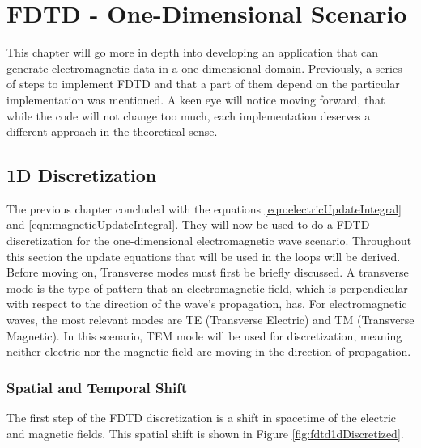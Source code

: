 
\chapter{FDTD - One-Dimensional Scenario} %

\label{Chapter2} %

This chapter will go more in depth into developing an application that can generate electromagnetic data in a one-dimensional domain. Previously, a series of steps to implement FDTD and that a part of them depend on the particular implementation was mentioned. A keen eye will notice moving forward, that while the code will not change too much, each implementation deserves a different approach in the theoretical sense.


\section{1D Discretization}

The previous chapter concluded with the equations \ref{eqn:electricUpdateIntegral} and \ref{eqn:magneticUpdateIntegral}. They will now be used to do a FDTD discretization for the one-dimensional electromagnetic wave scenario. Throughout this section the update equations that will be used in the loops will be derived. Before moving on, Transverse modes must first be briefly discussed. A transverse mode is the type of pattern that an electromagnetic field, which is perpendicular with respect to the direction of the wave's propagation, has. For electromagnetic waves, the most relevant modes are TE (Transverse Electric) and TM (Transverse Magnetic). In this scenario, TEM mode will be used for discretization, meaning neither electric nor the magnetic field are moving in the direction of propagation.

\subsection{Spatial and Temporal Shift}

The first step of the FDTD discretization is a shift in spacetime of the electric and magnetic fields. This spatial shift is shown in Figure \ref{fig:fdtd1dDiscretized}.

